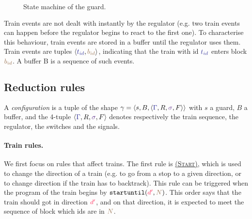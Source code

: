 \documentclass[runningheads]{llncs}
\newcommand{\ruleFmt}[1]{\textsc{(#1)}}
\newcommand{\ruleRef}[1]{\hyperlink{#1}{\ruleFmt{#1}}}
\newcommand{\tuple}[1]{\ensuremath{\langle #1\rangle}}
\newcommand{\dirFmt}[1]{{\color{dircolor} #1}}
\newcommand{\posFmt}[1]{{\color{poscolor}{#1}}}
\newcommand{\bid}[1]{\ensuremath{\posFmt{b_{#1}}}}
\newcommand{\swFmt}[1]{{\color{swcolor}{#1}}}
\newcommand{\switches}{\ensuremath{\swFmt{\sigma}}}
\newcommand{\trainFmt}[1]{{\color{traincolor} #1}}
\newcommand{\trainSeq}{\trainFmt{\Gamma\xspace}}
\newcommand{\tid}[1]{\ensuremath{\trainFmt{t_{#1}}}}
\newcommand{\su}[2]{{\mbox{$\mathtt{startuntil}(\dirFmt{#1}, \posFmt{#2})$}}\xspace}
\newcommand{\regulator}{\ensuremath{R}}
\newcommand{\signals}{\ensuremath{F}}
\newcommand{\stateTuple}[4]{\tuple{#1, #2, #3, #4}}
\newcommand{\guardFmt}[1]{{\color{guardcolor} \ensuremath{\mathtt{#1}}}}
\newcommand{\guardT}{\guardFmt{T}}
\newcommand{\guardS}{\guardFmt{S}}
\newcommand{\guardR}{\guardFmt{R}}
\newcommand{\bufferFmt}[1]{#1}
\newcommand{\redTuple}[3]{\ensuremath{\tuple{#1, #2, #3}}}
\begin{document}
\begin{figure}
	\centering
	\caption{State machine of the guard.}
	\label{fig:state_machine_guard}
\end{figure}

Train events are not dealt with instantly by the regulator (e.g. two train events can happen before the regulator begins to react to the first one). To characterise this behaviour, train events are stored in a buffer until the regulator uses them. Train events are tuples \tuple{\tid{id}, \bid{id}}, indicating that the train with id $\tid{id}$ enters block \bid{id}. A buffer \bufferFmt{B} is a sequence of such events.

\subsection{Reduction rules}

A \emph{configuration} is a tuple of the shape $\gamma =  \redTuple{s}{\bufferFmt{B}}{\stateTuple{\trainSeq{}}{\regulator}{\switches}{\signals}}$ with $s$ a guard, $B$ a buffer, and the 4-tuple $\stateTuple{\trainSeq{}}{\regulator}{\switches}{\signals}$ denotes respectively the train sequence, the regulator, the switches and the signals. 




\paragraph{Train rules.}
We first focus on rules that affect trains. The first rule is \ruleRef{Start}, which is used to change the direction of a train (e.g. to go from a stop to a given direction, or to change direction if the train has to backtrack). This rule can be triggered when the program of the train begins by \su{d^\prime}{N}. This order says that the train should got in direction $\dirFmt{d^\prime}$, and on that direction, it is expected to meet the sequence of block which ids are in $\posFmt{N}$.
\end{document}
